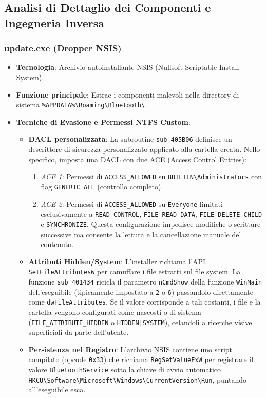 \subsection{Analisi di Dettaglio dei Componenti e Ingegneria Inversa}

\subsubsection{update.exe (Dropper NSIS)}
\begin{itemize}
  \item \textbf{Tecnologia}: Archivio autoinstallante NSIS (Nullsoft Scriptable Install System).
  \item \textbf{Funzione principale}: Estrae i componenti malevoli nella directory di sistema \texttt{\%APPDATA\%\textbackslash Roaming\textbackslash Bluetooth\textbackslash}.
  \item \textbf{Tecniche di Evasione e Permessi NTFS Custom}:
  \begin{itemize}
    \item \textbf{DACL personalizzata}: La subroutine \texttt{sub\_405B06} definisce un descrittore di sicurezza personalizzato applicato alla cartella creata. Nello specifico, imposta una DACL con due ACE (Access Control Entries):
    \begin{enumerate}
      \item \textit{ACE 1}: Permessi di \texttt{ACCESS\_ALLOWED} su \texttt{BUILTIN\textbackslash Administrators} con flag \texttt{GENERIC\_ALL} (controllo completo).
      \item \textit{ACE 2}: Permessi di \texttt{ACCESS\_ALLOWED} su \texttt{Everyone} limitati esclusivamente a \texttt{READ\_CONTROL}, \texttt{FILE\_READ\_DATA}, \texttt{FILE\_DELETE\_CHILD} e \texttt{SYNCHRONIZE}. Questa configurazione impedisce modifiche o scritture successive ma consente la lettura e la cancellazione manuale del contenuto.
    \end{enumerate}
    \item \textbf{Attributi Hidden/System}: L'installer richiama l'API \texttt{SetFileAttributesW} per camuffare i file estratti sul file system. La funzione \texttt{sub\_401434} ricicla il parametro \texttt{nCmdShow} della funzione \texttt{WinMain} dell'eseguibile (tipicamente impostato a \texttt{2} o \texttt{6}) passandolo direttamente come \texttt{dwFileAttributes}. Se il valore corrisponde a tali costanti, i file e la cartella vengono configurati come nascosti o di sistema (\texttt{FILE\_ATTRIBUTE\_HIDDEN} o \texttt{HIDDEN|SYSTEM}), celandoli a ricerche visive superficiali da parte dell'utente.
    \item \textbf{Persistenza nel Registro}: L'archivio NSIS contiene uno script compilato (opcode \texttt{0x33}) che richiama \texttt{RegSetValueExW} per registrare il valore \texttt{BluetoothService} sotto la chiave di avvio automatico \texttt{HKCU\textbackslash Software\textbackslash Microsoft\textbackslash Windows\textbackslash CurrentVersion\textbackslash Run}, puntando all'eseguibile esca.
  \end{itemize}
\end{itemize}

